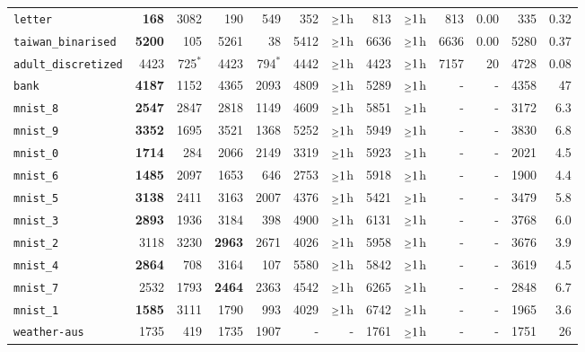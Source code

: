 \begin{tabular}{lrrrrrrrrrrrr}
\texttt{letter} & \textbf{168} & 3082 & 190 & 549 & 352 & $\mathsmaller{\geq}1$h & 813 & $\mathsmaller{\geq}1$h & 813 & 0.00 & 335 & 0.32\\
\texttt{taiwan\_binarised} & \textbf{5200} & 105 & 5261 & 38 & 5412 & $\mathsmaller{\geq}1$h & 6636 & $\mathsmaller{\geq}1$h & 6636 & 0.00 & 5280 & 0.37\\
\texttt{adult\_discretized} & 4423 & 725$^*$ & 4423 & 794$^*$ & 4442 & $\mathsmaller{\geq}1$h & 4423 & $\mathsmaller{\geq}1$h & 7157 & 20 & 4728 & 0.08\\
\texttt{bank} & \textbf{4187} & 1152 & 4365 & 2093 & 4809 & $\mathsmaller{\geq}1$h & 5289 & $\mathsmaller{\geq}1$h & - & - & 4358 & 47\\
\texttt{mnist\_8} & \textbf{2547} & 2847 & 2818 & 1149 & 4609 & $\mathsmaller{\geq}1$h & 5851 & $\mathsmaller{\geq}1$h & - & - & 3172 & 6.3\\
\texttt{mnist\_9} & \textbf{3352} & 1695 & 3521 & 1368 & 5252 & $\mathsmaller{\geq}1$h & 5949 & $\mathsmaller{\geq}1$h & - & - & 3830 & 6.8\\
\texttt{mnist\_0} & \textbf{1714} & 284 & 2066 & 2149 & 3319 & $\mathsmaller{\geq}1$h & 5923 & $\mathsmaller{\geq}1$h & - & - & 2021 & 4.5\\
\texttt{mnist\_6} & \textbf{1485} & 2097 & 1653 & 646 & 2753 & $\mathsmaller{\geq}1$h & 5918 & $\mathsmaller{\geq}1$h & - & - & 1900 & 4.4\\
\texttt{mnist\_5} & \textbf{3138} & 2411 & 3163 & 2007 & 4376 & $\mathsmaller{\geq}1$h & 5421 & $\mathsmaller{\geq}1$h & - & - & 3479 & 5.8\\
\texttt{mnist\_3} & \textbf{2893} & 1936 & 3184 & 398 & 4900 & $\mathsmaller{\geq}1$h & 6131 & $\mathsmaller{\geq}1$h & - & - & 3768 & 6.0\\
\texttt{mnist\_2} & 3118 & 3230 & \textbf{2963} & 2671 & 4026 & $\mathsmaller{\geq}1$h & 5958 & $\mathsmaller{\geq}1$h & - & - & 3676 & 3.9\\
\texttt{mnist\_4} & \textbf{2864} & 708 & 3164 & 107 & 5580 & $\mathsmaller{\geq}1$h & 5842 & $\mathsmaller{\geq}1$h & - & - & 3619 & 4.5\\
\texttt{mnist\_7} & 2532 & 1793 & \textbf{2464} & 2363 & 4542 & $\mathsmaller{\geq}1$h & 6265 & $\mathsmaller{\geq}1$h & - & - & 2848 & 6.7\\
\texttt{mnist\_1} & \textbf{1585} & 3111 & 1790 & 993 & 4029 & $\mathsmaller{\geq}1$h & 6742 & $\mathsmaller{\geq}1$h & - & - & 1965 & 3.6\\
\texttt{weather-aus} & 1735 & 419 & 1735 & 1907 & - & - & 1761 & $\mathsmaller{\geq}1$h & - & - & 1751 & 26\\
\bottomrule
\end{tabular}

